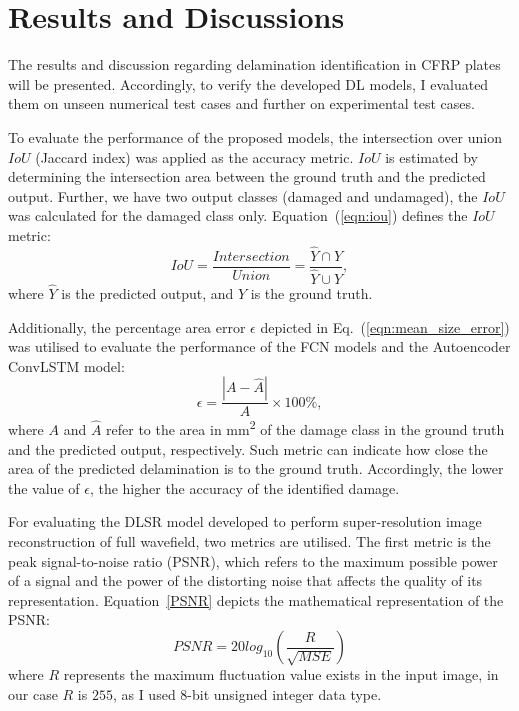 \chapter[Results and Discussions]{Results and Discussions}
\label{ch5}

The results and discussion regarding delamination identification in CFRP plates will be presented. 
Accordingly, to verify the developed DL models, I evaluated them on unseen numerical test cases and further on experimental test cases.

To evaluate the performance of the proposed models, the intersection over union \(IoU\) (Jaccard index) was applied as the accuracy metric.
\(IoU\) is estimated by determining the intersection
area between the ground truth and the predicted output.
Further, we have two output classes (damaged and undamaged), the \(IoU\) was calculated for the damaged class only.
Equation~(\ref{eqn:iou}) defines the \(IoU\) metric:
\begin{equation}
	IoU=\frac{Intersection}{Union}=\frac{\hat{Y} \cap Y}{\hat{Y} \cup Y},
	\label{eqn:iou}
\end{equation}
where \(\hat{Y}\) is the predicted output, and \(Y\) is the ground truth.

Additionally, the percentage area error $\epsilon$ depicted in Eq.~(\ref{eqn:mean_size_error}) was utilised to evaluate the performance of the FCN models and the Autoencoder ConvLSTM model:
\begin{equation}
	\epsilon=\frac{|A-\hat{A}|}{A} \times 100\%,
	\label{eqn:mean_size_error}
\end{equation}
where \(A\) and \(\hat{A}\) refer to the area in mm\textsuperscript{2} of the damage class in the ground truth and the predicted output, respectively.
Such metric can indicate how close the area of the predicted delamination is to the ground truth.
Accordingly, the lower the value of $\epsilon$, the higher the accuracy of the identified damage. 

For evaluating the DLSR model developed to perform super-resolution image reconstruction of full wavefield, two metrics are utilised.
The first metric is the peak signal-to-noise ratio (PSNR), which refers to the maximum possible power of a signal and the power of the distorting noise that affects the quality of its representation.
Equation~\ref{PSNR} depicts the mathematical representation of the PSNR:
\begin{equation}
	PSNR=20log_{10}\left(\frac{R}{\sqrt{MSE}}\right)
	\label{PSNR}
\end{equation}
where \(R\) represents the maximum fluctuation value exists in the input image, in our case \(R\) is \(255\), as I used 8-bit unsigned integer data type.

